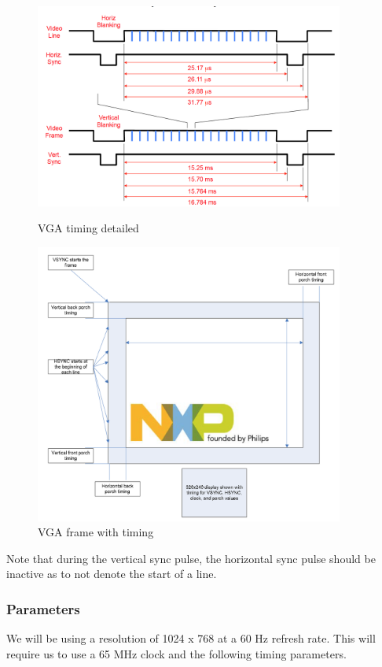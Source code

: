 \documentclass[11pt]{article}
\begin{document}
\begin{figure}[H]
\begin{center}
	\includegraphics[width=4in]{vga_timing}
	\caption{VGA timing detailed}
	\label{fig:vga_timing}
	
	\includegraphics[width=4in]{vga_frame}
	\caption{VGA frame with timing}
	\label{fig:vga_frame}
\end{center}
\end{figure}

Note that during the vertical sync pulse, the horizontal sync pulse should be inactive as to not denote the start of a line.

\subsubsection{Parameters}
We will be using a resolution of 1024 x 768 at a 60 Hz refresh rate. This will require us to use a 65 MHz clock and the following timing parameters.
\end{document}
